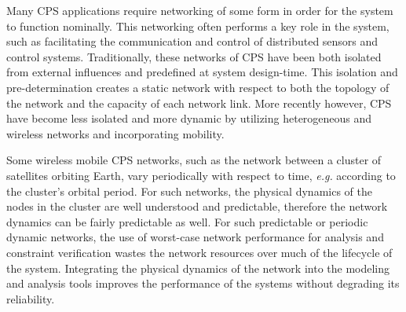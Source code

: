 Many CPS applications require networking of some form in order for the system to function nominally.  This networking often performs a key role in the system, such as facilitating the communication and control of distributed sensors and control systems.  Traditionally, these networks of CPS have been both isolated from external influences and predefined at system design-time.  This isolation and pre-determination creates a static network with respect to both the topology of the network and the capacity of each network link.
More recently however, CPS have become less isolated and more dynamic by utilizing heterogeneous and wireless networks and incorporating mobility.  


Some wireless mobile CPS networks, such as the network between a cluster of satellites orbiting Earth, 
vary periodically with respect to time, \emph{e.g.} according to the cluster's orbital period.  For such networks, the physical dynamics of the nodes in the cluster are well understood and predictable, therefore the network dynamics can be fairly predictable as well.  For such predictable or periodic dynamic networks, the use of worst-case network performance for analysis and constraint verification wastes the network resources over much of the lifecycle of the system. Integrating the physical dynamics of the network into the modeling and analysis tools improves the performance of the systems without degrading its reliability. 



